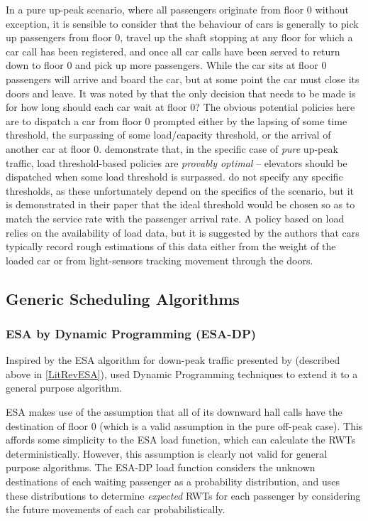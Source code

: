 \documentclass{UoYCSproject}
\begin{document}
In a pure up-peak scenario, where all passengers originate from floor 0 without exception, it is sensible to consider that the behaviour of cars is generally to pick up passengers from floor 0, travel up the shaft stopping at any floor for which a car call has been registered, and once all car calls have been served to return down to floor 0 and pick up more passengers.  While the car sits at floor 0 passengers will arrive and board the car, but at some point the car must close its doors and leave.  It was noted by \citet{Pepyne1997} that the only decision that needs to be made is for how long should each car wait at floor 0?  The obvious potential policies here are to dispatch a car from floor 0 prompted either by the lapsing of some time threshold, the surpassing of some load/capacity threshold, or the arrival of another car at floor 0.  \citet{Pepyne1997} demonstrate that, in the specific case of \textit{pure} up-peak traffic, load threshold-based policies are \textit{provably optimal} -- elevators should be dispatched when some load threshold is surpassed.  \citet{Pepyne1997} do not specify any specific thresholds, as these unfortunately depend on the specifics of the scenario, but it is demonstrated in their paper that the ideal threshold would be chosen so as to match the service rate with the passenger arrival rate.  A policy based on load relies on the availability of load data, but it is suggested by the authors that cars typically record rough estimations of this data either from the weight of the loaded car or from light-sensors tracking movement through the doors.

\subsection{Generic Scheduling Algorithms}

\subsubsection{ESA by Dynamic Programming (ESA-DP) \citep{Nikovski2003}}
\label{LitRevESADP}

Inspired by the ESA algorithm for down-peak traffic presented by \citet{Bao1994} (described above in \autoref{LitRevESA}), \citet{Nikovski2003} used Dynamic Programming techniques to extend it to a general purpose algorithm.

ESA makes use of the assumption that all of its downward hall calls have the destination of floor 0 (which is a valid assumption in the pure off-peak case).  This affords some simplicity to the ESA load function, which can calculate the RWTs deterministically.  However, this assumption is clearly not valid for general purpose algorithms.  The ESA-DP load function considers the unknown destinations of each waiting passenger as a probability distribution, and uses these distributions to determine \textit{expected} RWTs for each passenger by considering the future movements of each car probabilistically.
\end{document}
